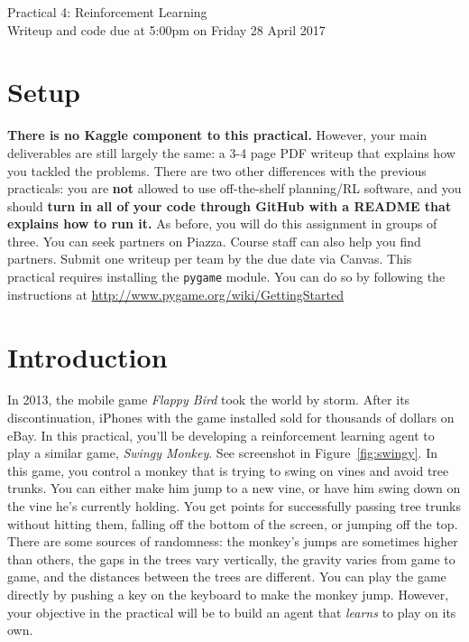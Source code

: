 \documentclass[12pt]{article}
\begin{document}
\begin{center}
{\Large Practical 4: Reinforcement Learning}\\
Writeup and code due at 5:00pm on Friday 28 April 2017\\
\end{center}

\section*{Setup}

{\bf There is no Kaggle component to this practical.}  However, your main deliverables are still largely the same: a 3-4 page PDF writeup that explains how you tackled the problems.  There are two other differences with the previous practicals: you are \textbf{not} allowed to use off-the-shelf planning/RL software, and you should {\bf turn in all of your code through GitHub with a README that explains how to run it.} As before, you will do this assignment in groups of three.  You can seek partners on Piazza.  Course staff can also help you find partners. Submit one writeup per team by the due date via Canvas.  This practical requires installing the \verb|pygame| module. You can do so by following the instructions at \url{http://www.pygame.org/wiki/GettingStarted}


\section*{Introduction}

In 2013, the mobile game \emph{Flappy Bird} took the world by storm.  After its discontinuation, iPhones with the game installed sold for thousands of dollars on eBay.  In this practical, you'll be developing a reinforcement learning agent to play a similar game, \emph{Swingy Monkey}.  See screenshot in Figure~\ref{fig:swingy}.  In this game, you control a monkey that is trying to swing on vines and avoid tree trunks.  You can either make him jump to a new vine, or have him swing down on the vine he's currently holding.  You get points for successfully passing tree trunks without hitting them, falling off the bottom of the screen, or jumping off the top.  There are some sources of randomness: the monkey's jumps are sometimes higher than others, the gaps in the trees vary vertically, the gravity varies from game to game, and the distances between the trees are different.  You can play the game directly by pushing a key on the keyboard to make the monkey jump.  However, your objective in the practical will be to build an agent that \emph{learns} to play on its own. 
\end{document}
